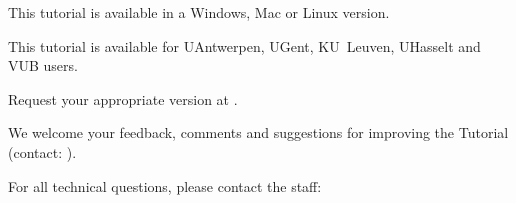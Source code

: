 This tutorial is available in a Windows, Mac or Linux version.

This tutorial is available for UAntwerpen, UGent, KU~Leuven, UHasselt and VUB users.

Request your appropriate version at \hpcinfo.


We welcome your feedback, comments and suggestions for improving the \hpc
Tutorial  (contact: \hpcinfo).

For all technical questions, please contact the \hpc staff:

